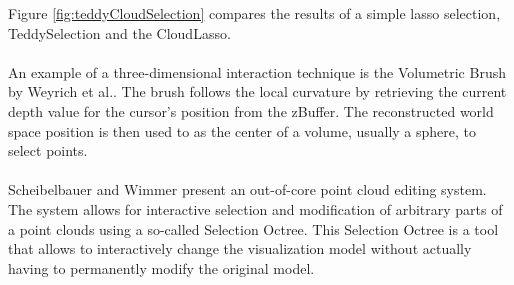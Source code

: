 Figure \ref{fig:teddyCloudSelection} compares the results of a simple lasso selection, TeddySelection and the CloudLasso. 
\\
\\

An example of a three-dimensional interaction technique is the Volumetric Brush by Weyrich et al.\cite{weyrich2004post}. The brush follows the local curvature by retrieving the current depth value for the cursor's position from the zBuffer. The reconstructed world space position is then used to as the center of a volume, usually a sphere, to select points. 
\\
\\
Scheibelbauer and Wimmer \cite{scheiblauer2011out} present an out-of-core point cloud editing system. The system allows for interactive selection and modification of arbitrary parts of a point clouds using a so-called Selection Octree. This Selection Octree is a tool that allows to interactively change the visualization model without actually having to permanently modify the original model. 
